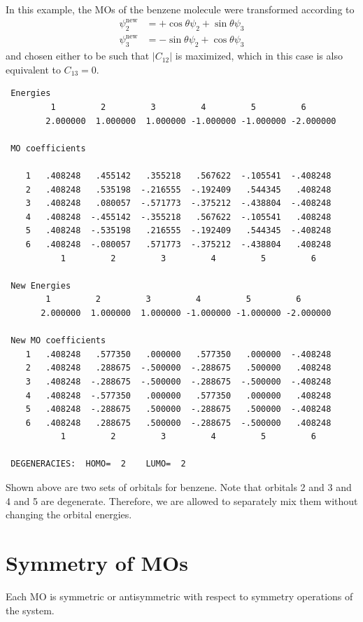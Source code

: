 \documentclass[../Main/chem532-notes.tex]{subfiles}
\begin{document}
\begin{example}
In this example, the MOs of the benzene molecule were transformed according to
\begin{align*}
\psi_2^\mathrm{new} & = +\cos \theta \psi_2 + \sin \theta \psi_3  \\
\psi_3^\mathrm{new} & = -\sin \theta \psi_2 + \cos \theta \psi_3 
\end{align*}
and chosen either to be such that $|C_{12}|$ is maximized, which in this case is also equivalent to $C_{13} = 0$.
\begin{verbatim}
 Energies
         1         2         3         4         5         6
        2.000000  1.000000  1.000000 -1.000000 -1.000000 -2.000000

 MO coefficients

    1   .408248   .455142   .355218   .567622  -.105541  -.408248
    2   .408248   .535198  -.216555  -.192409   .544345   .408248
    3   .408248   .080057  -.571773  -.375212  -.438804  -.408248
    4   .408248  -.455142  -.355218   .567622  -.105541   .408248
    5   .408248  -.535198   .216555  -.192409   .544345  -.408248
    6   .408248  -.080057   .571773  -.375212  -.438804   .408248
           1         2         3         4         5         6

 New Energies
        1         2         3         4         5         6
       2.000000  1.000000  1.000000 -1.000000 -1.000000 -2.000000

 New MO coefficients
    1   .408248   .577350   .000000   .577350   .000000  -.408248
    2   .408248   .288675  -.500000  -.288675   .500000   .408248
    3   .408248  -.288675  -.500000  -.288675  -.500000  -.408248
    4   .408248  -.577350   .000000   .577350   .000000   .408248
    5   .408248  -.288675   .500000  -.288675   .500000  -.408248
    6   .408248   .288675   .500000  -.288675  -.500000   .408248
           1         2         3         4         5         6

 DEGENERACIES:  HOMO=  2    LUMO=  2
\end{verbatim}
Shown above are two sets of orbitals for benzene. Note that orbitals 2 and 3 and 4 and 5 are degenerate. Therefore, we are allowed to separately mix them without changing the orbital energies.
\end{example}

\section{Symmetry of MOs}
Each MO is symmetric or antisymmetric with respect to symmetry operations of the system.
\end{document}
